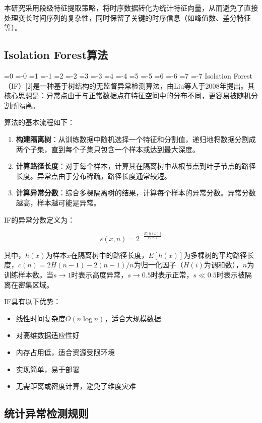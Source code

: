 \documentclass[12pt, a4paper]{article}
\newcommand{\zihao}[1]{%
    \ifnum#1=0 {\fontsize{42pt}{50pt}\selectfont}%
    \else\ifnum#1=-0 {\fontsize{36pt}{44pt}\selectfont}%
    \else\ifnum#1=1 {\fontsize{26pt}{32pt}\selectfont}%
    \else\ifnum#1=-1 {\fontsize{24pt}{28pt}\selectfont}%
    \else\ifnum#1=2 {\fontsize{22pt}{26pt}\selectfont}%
    \else\ifnum#1=-2 {\fontsize{18pt}{22pt}\selectfont}%
    \else\ifnum#1=3 {\fontsize{16pt}{20pt}\selectfont}%
    \else\ifnum#1=-3 {\fontsize{15pt}{18pt}\selectfont}%
    \else\ifnum#1=4 {\fontsize{14pt}{17pt}\selectfont}%
    \else\ifnum#1=-4 {\fontsize{12pt}{15pt}\selectfont}%
    \else\ifnum#1=5 {\fontsize{10.5pt}{13pt}\selectfont}%
    \else\ifnum#1=-5 {\fontsize{9pt}{11pt}\selectfont}%
    \else\ifnum#1=6 {\fontsize{7.5pt}{9pt}\selectfont}%
    \else\ifnum#1=-6 {\fontsize{6.5pt}{8pt}\selectfont}%
    \else\ifnum#1=7 {\fontsize{5.5pt}{7pt}\selectfont}%
    \else\ifnum#1=-7 {\fontsize{5pt}{6pt}\selectfont}%
    \fi\fi\fi\fi\fi\fi\fi\fi\fi\fi\fi\fi\fi\fi\fi\fi
}
\newcommand{\songti}{\CJKfontspec{SimSun}}
\begin{document}
本研究采用段级特征提取策略，将时序数据转化为统计特征向量，从而避免了直接处理变长时间序列的复杂性，同时保留了关键的时序信息（如峰值数、差分特征等）。

\subsection{Isolation Forest算法}

\zihao{5}\songti
Isolation Forest（IF）[2]是一种基于树结构的无监督异常检测算法，由Liu等人于2008年提出。其核心思想是：异常点由于与正常数据点在特征空间中的分布不同，更容易被随机分割所隔离。

算法的基本流程如下：

\begin{enumerate}[label=(\arabic*)]
    \item \textbf{构建隔离树}：从训练数据中随机选择一个特征和分割值，递归地将数据分割成两个子集，直到每个子集只包含一个样本或达到最大深度。
    \item \textbf{计算路径长度}：对于每个样本，计算其在隔离树中从根节点到叶子节点的路径长度。异常点由于分布稀疏，路径长度通常较短。
    \item \textbf{计算异常分数}：综合多棵隔离树的结果，计算每个样本的异常分数。异常分数越高，样本越可能是异常。
\end{enumerate}

IF的异常分数定义为：

\begin{equation}
s(x, n) = 2^{-\frac{E[h(x)]}{c(n)}}
\end{equation}

其中，$h(x)$为样本$x$在隔离树中的路径长度，$E[h(x)]$为多棵树的平均路径长度，$c(n) = 2H(n-1) - 2(n-1)/n$为归一化因子（$H(i)$为调和数），$n$为训练样本数。当$s \to 1$时表示高度异常，$s \to 0.5$时表示正常，$s \ll 0.5$时表示被隔离在密集区域。

IF具有以下优势：
\begin{itemize}
    \item 线性时间复杂度$O(n\log n)$，适合大规模数据
    \item 对高维数据适应性好
    \item 内存占用低，适合资源受限环境
    \item 实现简单，易于部署
    \item 无需距离或密度计算，避免了维度灾难
\end{itemize}

\subsection{统计异常检测规则}
\end{document}
